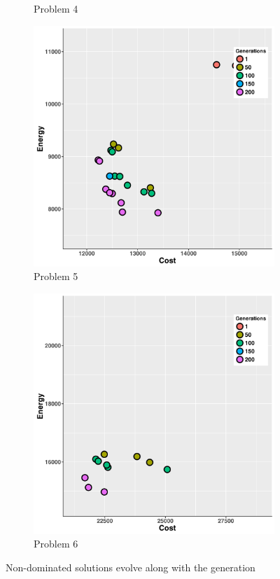 \begin{figure}
\begin{subfigure}[b]{0.45\textwidth}
   \caption{Problem 4}
   \label{fig:d}
   \end{subfigure}
   \begin{subfigure}[b]{0.45\textwidth}\includegraphics[width=\textwidth]{pics/preliminary/without/testCase5_.png}
   \caption{Problem 5}
   \label{fig:e}
   \end{subfigure}
   \begin{subfigure}[b]{0.45\textwidth}\includegraphics[width=\textwidth]{pics/preliminary/without/testCase6_.png}
   \caption{Problem 6}
   \label{fig:f}
   \end{subfigure}
   \caption{Non-dominated solutions evolve along with the generation}
   \label{fig:evolve}
\end{figure}

